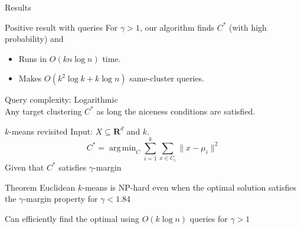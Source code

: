 \documentclass{beamer}
\newcommand{\mb}{\mathbf}
\DeclareMathOperator*{\argmin}{arg\,min}
\begin{document}
\begin{frame}{Results}

	\begin{block}{Positive result with queries}
		\vspace{10pt}For $\gamma > 1$, our algorithm finds $C^*$ (with high probability) and 
		\begin{itemize}
		\vspace{10pt}\item Runs in $O(kn\log n)$ time.
        \vspace{10pt}\item Makes $O(k^2\log k + k\log n)$ same-cluster queries.
		\end{itemize}
	\end{block}
	
	\vspace{20pt}Query complexity: Logarithmic\\
	\vspace{10pt}Any target clustering $C^*$ as long the niceness conditions are satisfied. 
\end{frame}

\begin{frame}{$k$-means revisited}
	\vspace{-20pt}Input: $X \subseteq \mb R^d$ and $k$.
	\vspace{-10pt}$$C^* = \argmin_{C} \sum_{i=1}^k \sum_{x \in C_i} \|x - \mu_i\|^2$$
	\vspace{10pt}Given that $C^*$ satisfies $\gamma$-margin\\
	
	\vspace{10pt}\begin{block}{Theorem}
	Euclidean $k$-means is NP-hard even when the optimal solution satisfies the $\gamma$-margin property for $\gamma < 1.84$
	\end{block}
	
	\vspace{20pt} Can efficiently find the optimal using $O(k\log n)$ queries for $\gamma > 1$
\end{frame}
\end{document}
